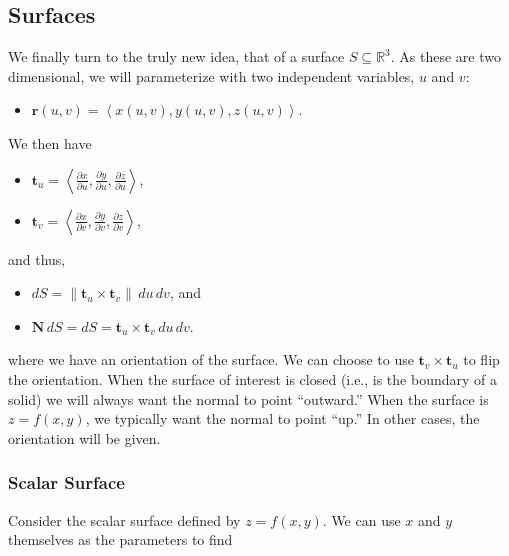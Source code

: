 \documentclass[10pt]{article}
\newcommand{\mb}[1]{\mathbf{#1}}
\newcommand{\brackett}[1]{\left\langle #1 \right\rangle}
\newcommand{\vecfuc}[2]{\mb{#1}(#2)}
\newcommand{\mysqrt}[1]{%
  \mathpalette\foo{#1}%
}
\newcommand{\R}{\mathbb{R}}
\newcommand{\foo}[2]{%
  \sbox0{$#1\sqrt{#2}$}%
  \begin{tikzpicture}[baseline=(sqrt.base)]
    \node[inner sep=0, outer sep=0] (sqrt) {$#1\sqrt{#2}$}; %
    \draw([yshift=-0.045em]sqrt.north east) -- ++(0,-0.5ex); %
  \end{tikzpicture}%
}
\begin{document}
\subsection*{Surfaces}

We finally turn to the truly new idea, that of a surface \(S \subseteq \R^{3}\). As these are two dimensional, we will parameterize with two independent variables, \(u\) and \(v\):
\begin{itemize}
    \item \(\vecfuc{r}{u,v} = \brackett{x(u,v), y(u,v), z(u,v)}\).
\end{itemize}
We then have
\begin{itemize}
    \item \(\mb{t}_{u} = \displaystyle\brackett{\frac{\partial x}{\partial u}, \frac{\partial y}{\partial u}, \frac{\partial z}{\partial u}}\),
    \item \(\mb{t}_{v} = \displaystyle\brackett{\frac{\partial x}{\partial v}, \frac{\partial y}{\partial v}, \frac{\partial z}{\partial v}}\),
\end{itemize}
and thus, 
\begin{itemize}
    \item \(dS = \| \mb{t}_{u} \times \mb{t}_{v} \| \, du \, dv\), and
    \item \(\mb{N} \, dS = dS = \mb{t}_{u} \times \mb{t}_{v} \, du \, dv\).
\end{itemize}
where we have an orientation of the surface. We can choose to use \(\mb{t}_{v} \times \mb{t}_{u}\) to flip the orientation. When the surface of interest is closed (i.e., is the boundary of a solid) we will always want the normal to point ``outward.'' When the surface is \(z = f(x,y)\), we typically want the normal to point ``up.'' In other cases, the orientation will be given.

\subsubsection*{Scalar Surface}

Consider the scalar surface defined by \(z = f(x,y)\). We can use \(x\) and \(y\) themselves as the parameters to find
\end{document}
